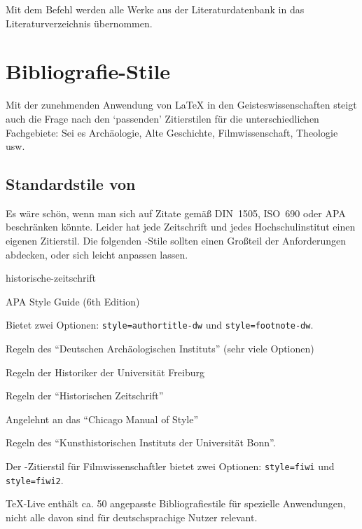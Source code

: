 Mit dem Befehl \marg{*} werden alle Werke aus der
Literaturdatenbank in das Literaturverzeichnis übernommen.


\section{Bibliografie-Stile}\label{sec:bibliografiestile}
Mit der zunehmenden Anwendung von \LaTeX{} in den Geisteswissenschaften steigt auch die Frage nach den \enquote*{passenden} Zitierstilen für die unterschiedlichen Fachgebiete:
Sei es Archäologie, Alte Geschichte, Filmwissenschaft, Theologie usw.
\subsection{Standardstile von \biblatex}

Es wäre schön, wenn man sich auf Zitate gemäß DIN~1505, ISO~690 oder APA beschränken könnte.
Leider hat jede Zeitschrift und jedes Hochschulinstitut einen eigenen Zitierstil.
Die folgenden \biblatex-Stile sollten einen Großteil der Anforderungen abdecken, oder sich leicht anpassen lassen.

\begin{labeling}{historische-zeitschrift}
  \item[biblatex-apa]       APA Style Guide (6th Edition)
  \item[biblatex-dw]        Bietet zwei Optionen: \lstinline/style=authortitle-dw/ und \lstinline/style=footnote-dw/.
  \item[biblatex-archaeology] Regeln des \enquote{Deutschen Archäologischen Instituts} (sehr viele Optionen)
  \item[geschichtsfrkl]     Regeln der Historiker der Universität Freiburg
  \item[historische-zeitschrift] Regeln der \enquote{Historischen
    Zeitschrift}
  \item[biblatex-historian] Angelehnt an das \enquote{Chicago Manual of Style}
  \item[biblatex-arthistory-bonn] Regeln des \enquote{Kunsthistorischen Instituts der Universität Bonn}.
  \item[biblatex-fiwi]      Der \biblatex-Zitierstil für Filmwissenschaftler bietet zwei Optionen: \lstinline/style=fiwi/ und \lstinline/style=fiwi2/.
\end{labeling}


TeX-Live enthält ca. 50 angepasste Bibliografiestile für spezielle Anwendungen, 
nicht alle davon sind für deutschsprachige Nutzer relevant.


